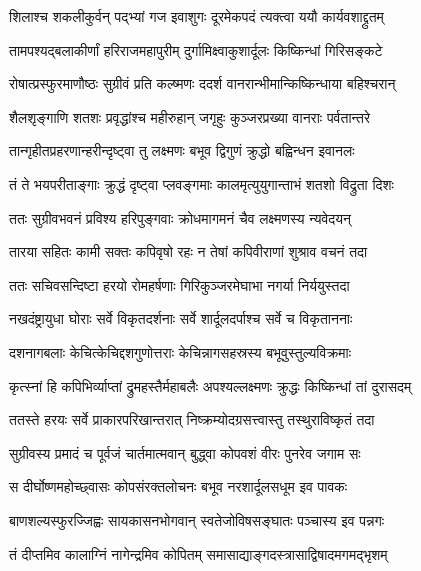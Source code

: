 \twolineshloka
{शिलाश्च शकलीकुर्वन् पद्भ्यां गज इवाशुगः}
{दूरमेकपदं त्यक्त्वा ययौ कार्यवशाद्द्रुतम्} %

\twolineshloka
{तामपश्यद्बलाकीर्णां हरिराजमहापुरीम्}
{दुर्गामिक्ष्वाकुशार्दूलः किष्किन्धां गिरिसङ्कटे} %

\twolineshloka
{रोषात्प्रस्फुरमाणौष्ठः सुग्रीवं प्रति कल्ष्मणः}
{ददर्श वानरान्भीमान्किष्किन्धाया बहिश्चरान्} %

\twolineshloka
{शैलशृङ्गाणि शतशः प्रवृद्धांश्च महीरुहान्}
{जगृहुः कुञ्जरप्रख्या वानराः पर्वतान्तरे} %

\twolineshloka
{तान्गृहीतप्रहरणान्हरीन्दृष्ट्वा तु लक्ष्मणः}
{बभूव द्विगुणं क्रुद्धो बह्विन्धन इवानलः} %

\twolineshloka
{तं ते भयपरीताङ्गाः क्रुद्धं दृष्ट्वा प्लवङ्गमाः}
{कालमृत्युयुगान्ताभं शतशो विद्रुता दिशः} %

\twolineshloka
{ततः सुग्रीवभवनं प्रविश्य हरिपुङ्गवाः}
{क्रोधमागमनं चैव लक्ष्मणस्य न्यवेदयन्} %

\twolineshloka
{तारया सहितः कामी सक्तः कपिवृषो रहः}
{न तेषां कपिवीराणां शुश्राव वचनं तदा} %

\twolineshloka
{ततः सचिवसन्दिष्टा हरयो रोमहर्षणाः}
{गिरिकुञ्जरमेघाभा नगर्या निर्ययुस्तदा} %

\twolineshloka
{नखदंष्ट्रायुधा घोराः सर्वे विकृतदर्शनाः}
{सर्वे शार्दूलदर्पाश्च सर्वे च विकृताननाः} %

\twolineshloka
{दशनागबलाः केचित्केचिद्दशगुणोत्तराः}
{केचिन्नागसहस्रस्य बभूवुस्तुल्यविक्रमाः} %

\twolineshloka
{कृत्स्नां हि कपिभिर्व्याप्तां द्रुमहस्तैर्महाबलैः}
{अपश्यल्लक्ष्मणः क्रुद्धः किष्किन्धां तां दुरासदम्} %

\twolineshloka
{ततस्ते हरयः सर्वे प्राकारपरिखान्तरात्}
{निष्क्रम्योदग्रसत्त्वास्तु तस्थुराविष्कृतं तदा} %

\twolineshloka
{सुग्रीवस्य प्रमादं च पूर्वजं चार्तमात्मवान्}
{बुद्ध्वा कोपवशं वीरः पुनरेव जगाम सः} %

\twolineshloka
{स दीर्घोष्णमहोच्छ्वासः कोपसंरक्तलोचनः}
{बभूव नरशार्दूलसधूम इव पावकः} %

\twolineshloka
{बाणशल्यस्फुरज्जिह्वः सायकासनभोगवान्}
{स्वतेजोविषसङ्घातः पञ्चास्य इव पन्नगः} %

\twolineshloka
{तं दीप्तमिव कालाग्निं नागेन्द्रमिव कोपितम्}
{समासाद्याङ्गदस्त्रासाद्विषादमगमद्भृशम्} %

